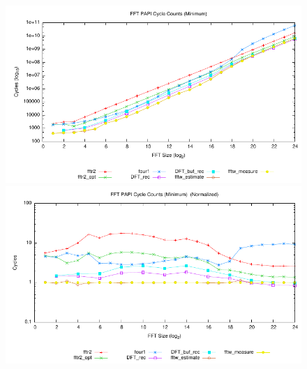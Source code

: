 \documentclass[11 pt]{article}
\begin{document}
\begin{figure}[htbp]
  \centering
	\includegraphics[width=\columnwidth]{../plots/tot_cyc_min}
	\includegraphics[width=\columnwidth]{../plots/tot_cyc_min_norm}
  \caption{}
  \label{fig:cyc_min}
\end{figure}
\end{document}
